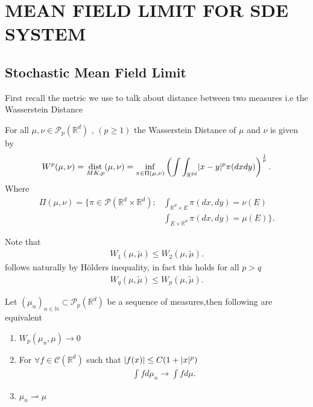 \chapter{MEAN FIELD LIMIT FOR SDE SYSTEM}
% 
% 
% 
\section{Stochastic Mean Field Limit}
First recall the metric we use to talk about distance between two measures i.e the Wasserstein Distance
\begin{definition}
  For all $\mu , \nu  \in  \mathcal{P}_p(\mathbb{R}^{d} )$  , $(p\ge 1) $ the Wasserstein Distance of $\mu $ and $\nu $ is given by 
  \begin{align*}
    W^{p}(\mu ,\nu ) = \operatorname*{dist}_{MK,p}(\mu ,\nu ) = \inf_{\pi \in  \Pi(\mu ,\nu )} \left( \int \int_{\mathbb{R}^{2d} } \lvert x-y\rvert^{p} \pi(dxdy) \right)^{\frac{1}{p}}  
  .\end{align*}
  Where  
  \begin{align*}
    \Pi(\mu ,\nu ) = \Bigg\{\pi \in \mathcal{P}(\mathbb{R}^{d} \times  \mathbb{R}^{d}  ) : &\int_{\mathbb{R}^{d}\times E } \pi(dx,dy) = \nu(E) \\
                                                                                      &\int_{E \times  \mathbb{R}^{d} } \pi(dx,dy) = \mu(E)\Bigg\}  
  .\end{align*}
\end{definition}
\begin{remark}
 Note that 
 \begin{align*}
   W_1(\mu ,\tilde{\mu } ) \le  W_{2}(\mu ,\tilde{\mu } )
 .\end{align*}
 follows naturally by Hölders inequality, in fact this holds for all $p>q$
  \begin{align*}
   W_q(\mu ,\tilde{\mu } ) \le  W_{p}(\mu ,\tilde{\mu } )
 .\end{align*}
\end{remark}
\begin{remark}
  Let $(\mu_n)_{n \in  \mathbb{N}} \subset  \mathcal{P}_p(\mathbb{R}^{d} )$ be a sequence of measures,then following are equivalent
  \begin{enumerate}
   \item $W_p(\mu_n,\mu ) \to 0$
    \item  For $\forall f \in \mathcal{C}(\mathbb{R}^{d} )$ such that $\lvert f(x)\rvert \le  C(1+\lvert x\rvert^{p} )$
     \begin{align*}
      \int  f d\mu_n \to \int  f d\mu 
     .\end{align*} 
    \item $\mu_n \rightharpoonup \mu $
  \end{enumerate} 
\end{remark}
\newpage
